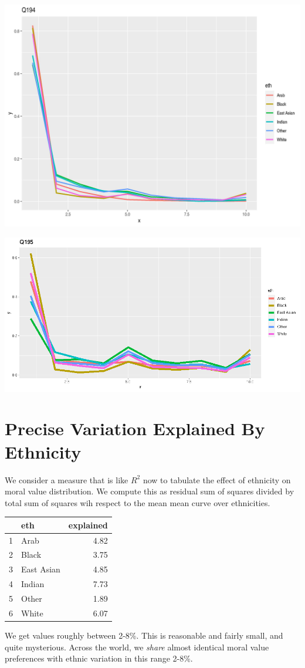 \documentclass{amsart}
\begin{document}
\includegraphics[scale=0.7]{q194.jpeg}

\includegraphics[scale=0.7]{q195.jpeg}

\section{Precise Variation Explained By Ethnicity}

We consider a measure that is like $R^2$ now to tabulate the effect of ethnicity on moral value distribution.  We compute this as residual sum of squares divided by total sum of squares wih respect to the mean mean curve over ethnicities.

\begin{table}[ht]
\centering
\begin{tabular}{rlr}
  \hline
 & eth & explained \\ 
  \hline
1 & Arab & 4.82 \\ 
  2 & Black & 3.75 \\ 
  3 & East Asian & 4.85 \\ 
  4 & Indian & 7.73 \\ 
  5 & Other & 1.89 \\ 
  6 & White & 6.07 \\ 
   \hline
\end{tabular}
\end{table}

We get values roughly between 2-8\%.  This is reasonable and fairly small, and quite mysterious.  Across the world, we {\em share} almost identical moral value preferences with ethnic variation in this range 2-8\%.
\end{document}
